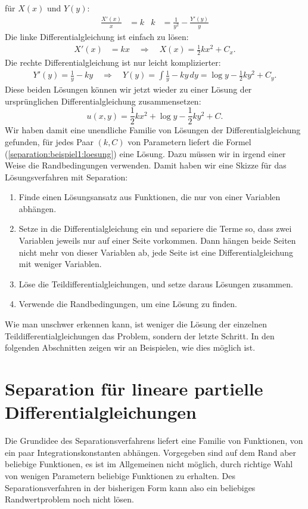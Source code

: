 für $X(x)$ und $Y(y)$:
\begin{align}
\frac{X'(x)}{x}&=k
&
k&=\frac1{y^2}-\frac{Y'(y)}{y}
\label{separation:beispiel1:separiertedgl}
\end{align}
Die linke Differentialgleichung ist einfach zu lösen:
\begin{align*}
X'(x)&=kx\quad\Rightarrow\quad X(x)=
\frac12kx^2+C_x.
\end{align*}
Die rechte Differentialgleichung ist nur leicht komplizierter:
\begin{align*}
Y'(y)=\frac1y-ky
\quad\Rightarrow\quad
Y(y)=\int\frac1y-ky\,dy=
\log y-\frac12ky^2+C_y.
\end{align*}
Diese beiden Lösungen können wir jetzt wieder zu einer Lösung der
ursprünglichen Differentialgleichung zusammensetzen:
\begin{equation}
u(x,y)=
\frac12kx^2+
\log y-\frac12ky^2+C.
\label{separation:beispiel1:loesung}
\end{equation}
Wir haben damit eine unendliche Familie von Lösungen der
Differentialgleichung gefunden, für jedes Paar $(k,C)$ von
Parametern liefert die Formel (\ref{separation:beispiel1:loesung})
eine Lösung.
Dazu müssen wir in irgend einer Weise die Randbedingungen verwenden.
Damit haben wir eine Skizze für das Lösungsverfahren mit Separation:
\begin{enumerate}
\item Finde einen Lösungsansatz aus Funktionen, die nur von einer
Variablen abhängen.
\item Setze in die Differentialgleichung ein und separiere die Terme
so, dass zwei Variablen jeweils nur auf einer Seite vorkommen. Dann
hängen beide Seiten nicht mehr von dieser Variablen ab, jede Seite
ist eine Differentialgleichung mit weniger Variablen.
\item Löse die Teildifferentialgleichungen, und setze daraus 
Lösungen zusammen. 
\item Verwende die Randbedingungen, um eine Lösung zu finden.
\end{enumerate}
Wie man unschwer erkennen kann, ist weniger die Lösung der
einzelnen Teildifferentialgleichungen das Problem, sondern der letzte
Schritt. In den folgenden Abschnitten zeigen wir an Beispielen, wie
dies möglich ist.

\section{Separation für lineare partielle Differentialgleichungen}
Die Grundidee des Separationsverfahrens liefert eine Familie von Funktionen,
von ein paar Integrationskonstanten abhängen. Vorgegeben sind auf dem
Rand aber beliebige Funktionen, es ist im Allgemeinen nicht möglich,
durch richtige Wahl von wenigen Parametern beliebige Funktionen zu erhalten.
Des Separationsverfahren in der bisherigen Form kann also ein
beliebiges Randwertproblem noch nicht lösen.

